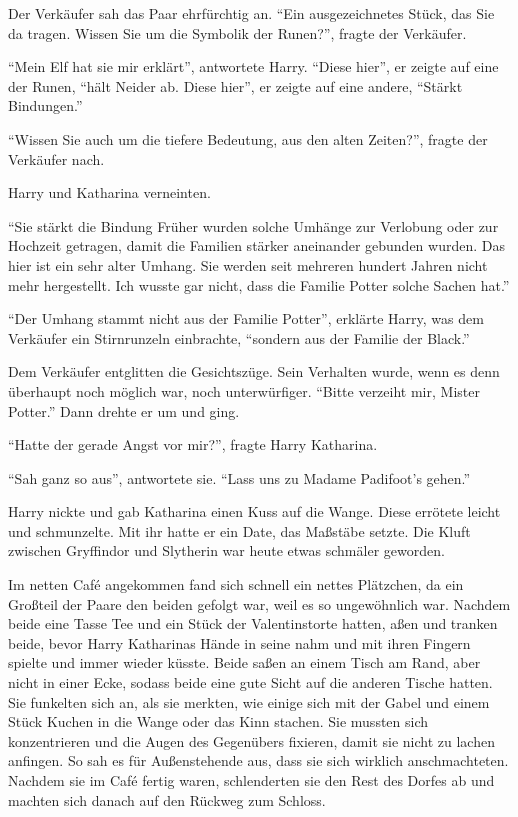 Der Verkäufer sah das Paar ehrfürchtig an. \enquote{Ein ausgezeichnetes Stück, das Sie da tragen. Wissen Sie um die Symbolik der Runen?}, fragte der Verkäufer.

\enquote{Mein Elf hat sie mir erklärt}, antwortete Harry. \enquote{Diese hier}, er zeigte auf eine der Runen, \enquote{hält Neider ab. Diese hier}, er zeigte auf eine andere, \enquote{Stärkt Bindungen.}

\enquote{Wissen Sie auch um die tiefere Bedeutung, aus den alten Zeiten?}, fragte der Verkäufer nach.

Harry und Katharina verneinten.

\enquote{Sie stärkt die  Bindung \gst Früher wurden solche Umhänge zur Verlobung oder zur Hochzeit getragen, damit die Familien stärker aneinander gebunden wurden. Das hier ist ein sehr alter Umhang. Sie werden seit mehreren hundert Jahren nicht mehr hergestellt. Ich wusste gar nicht, dass die Familie Potter solche Sachen hat.}

\enquote{Der Umhang stammt nicht aus der Familie Potter}, erklärte Harry, was dem Verkäufer ein Stirnrunzeln einbrachte, \enquote{sondern aus der Familie der Black.}

Dem Verkäufer entglitten die Gesichtszüge. Sein Verhalten wurde, wenn es denn überhaupt noch möglich war, noch unterwürfiger. \enquote{Bitte verzeiht mir, Mister Potter.} Dann drehte er um und ging.

\enquote{Hatte der gerade Angst vor mir?}, fragte Harry Katharina.

\enquote{Sah ganz so aus}, antwortete sie. \enquote{Lass uns zu Madame Padifoot’s gehen.}

Harry nickte und gab Katharina einen Kuss auf die Wange. Diese errötete leicht und schmunzelte. Mit ihr hatte er ein Date, das Maßstäbe setzte. Die Kluft zwischen Gryffindor und Slytherin war heute etwas schmäler geworden.

Im netten Café angekommen fand sich schnell ein nettes Plätzchen, da ein Großteil der Paare den beiden gefolgt war, weil es so ungewöhnlich war. Nachdem beide eine Tasse Tee und ein Stück der Valentinstorte hatten, aßen und tranken beide, bevor Harry Katharinas Hände in seine nahm und mit ihren Fingern spielte und immer wieder küsste. Beide saßen an einem Tisch am Rand, aber nicht in einer Ecke, sodass beide eine gute Sicht auf die anderen Tische hatten. Sie funkelten sich an, als sie merkten, wie einige sich mit der Gabel und einem Stück Kuchen in die Wange oder das Kinn stachen. Sie mussten sich konzentrieren und die Augen des Gegenübers fixieren, damit sie nicht zu lachen anfingen. So sah es für Außenstehende aus, dass sie sich wirklich anschmachteten. Nachdem sie im Café fertig waren, schlenderten sie den Rest des Dorfes ab und machten sich danach auf den Rückweg zum Schloss.

